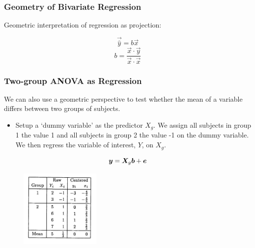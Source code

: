 \documentclass{beamer}
\begin{document}
\begin{frame}
  \frametitle{Geometry of Bivariate Regression}

Geometric interpretation of regression as projection:

\begin{center}


\[
\vec{\widehat{y}} = b\vec{x}
\]
\begin{equation}
b = \frac{\vec{x} \cdot \vec{y}}{\vec{x} \cdot \vec{x}}
\end{equation}

\end{center}

\end{frame}



\begin{frame}
  \frametitle{Two-group ANOVA as Regression}

We can also use a geometric perspective to test whether the mean of a variable differs between two groups of subjects.

\begin{itemize}
\item Setup a `dummy variable' as the predictor $X_g$.   We assign all subjects in group 1 the value 1 and all subjects in group 2 the value -1 on the dummy variable.  We then regress the variable of interest, $Y$, on $X_g$.

\end{itemize}
%
$$
\bm{y} = \bm{X}_g\bm{b} + \bm{e}
$$
%
\begin{figure}
{\centering \includegraphics[height=1.5in]{anova-2group-table.pdf}}
\end{figure}


\end{frame}
\end{document}
